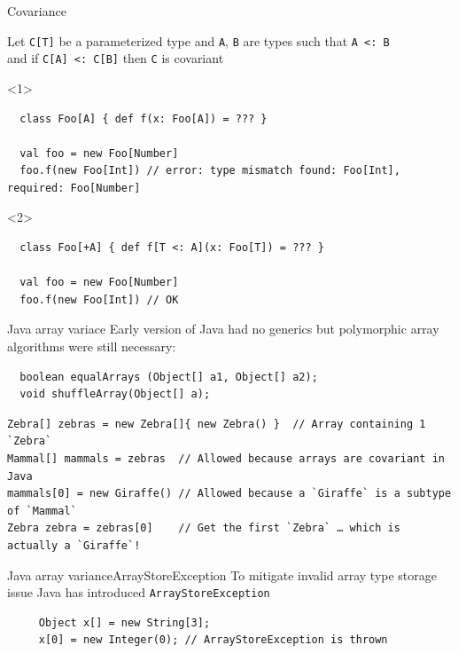 \documentclass[aspectratio=169]{beamer}
\begin{document}
\begin{frame}[fragile]{Covariance}
  \begin{block}{}
  Let \texttt{C[T]} be a parameterized type and \texttt{A}, \texttt{B} are types such that \texttt{A <:
  B} \\
  and if \texttt{C[A] <: C[B]} then \texttt{C} is \alert{covariant} 
  \end{block}
  \vspace{1em}
\begin{onlyenv}<1>
    \begin{verbatim}
  class Foo[A] { def f(x: Foo[A]) = ??? }

  val foo = new Foo[Number]
  foo.f(new Foo[Int]) // error: type mismatch found: Foo[Int], required: Foo[Number]
  \end{verbatim}
\end{onlyenv}
\begin{onlyenv}<2>
    \begin{verbatim}
  class Foo[+A] { def f[T <: A](x: Foo[T]) = ??? }

  val foo = new Foo[Number]
  foo.f(new Foo[Int]) // OK
  \end{verbatim}
\end{onlyenv}
\end{frame}

\begin{frame}[fragile]{Java array variace}
  Early version of Java had no generics but polymorphic array algorithms were still necessary:
  \vspace{1em}
  \begin{verbatim}
  boolean equalArrays (Object[] a1, Object[] a2);
  void shuffleArray(Object[] a);
  \end{verbatim}
  \vspace{1em}
  \pause
  \begin{verbatim}
Zebra[] zebras = new Zebra[]{ new Zebra() }  // Array containing 1 `Zebra`
Mammal[] mammals = zebras  // Allowed because arrays are covariant in Java
mammals[0] = new Giraffe() // Allowed because a `Giraffe` is a subtype of `Mammal`
Zebra zebra = zebras[0]    // Get the first `Zebra` … which is actually a `Giraffe`!
  \end{verbatim}
\end{frame}

\begin{frame}[fragile]{Java array variance}{ArrayStoreException}
  To mitigate invalid array type storage issue Java has introduced
  \texttt{ArrayStoreException} \cite{arstex}
  \vspace{3em}
  \begin{verbatim}
     Object x[] = new String[3];
     x[0] = new Integer(0); // ArrayStoreException is thrown
  \end{verbatim}
\end{frame}
\end{document}
